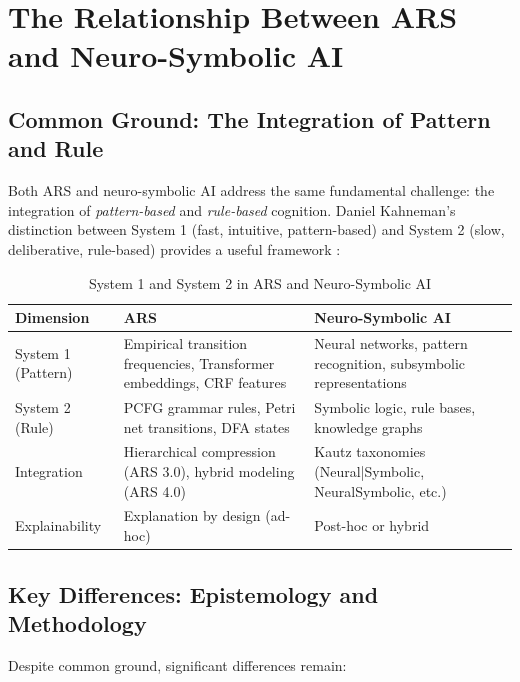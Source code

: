 \documentclass[12pt,a4paper]{article}
\begin{document}
\section{The Relationship Between ARS and Neuro-Symbolic AI}

\subsection{Common Ground: The Integration of Pattern and Rule}

Both ARS and neuro-symbolic AI address the same fundamental challenge: the 
integration of \textit{pattern-based} and \textit{rule-based} cognition. 
Daniel Kahneman's distinction between System 1 (fast, intuitive, pattern-based) 
and System 2 (slow, deliberative, rule-based) provides a useful framework 
\citep{kahneman2011thinking}:

\begin{table}[H]
\centering
\caption{System 1 and System 2 in ARS and Neuro-Symbolic AI}
\label{tab:kahneman}
\begin{tabular}{@{} p{3cm} p{4cm} p{4cm} @{}}
\toprule
\textbf{Dimension} & \textbf{ARS} & \textbf{Neuro-Symbolic AI} \\
\midrule
System 1 (Pattern) & Empirical transition frequencies, Transformer embeddings, CRF features & Neural networks, pattern recognition, subsymbolic representations \\
System 2 (Rule) & PCFG grammar rules, Petri net transitions, DFA states & Symbolic logic, rule bases, knowledge graphs \\
Integration & Hierarchical compression (ARS 3.0), hybrid modeling (ARS 4.0) & Kautz taxonomies (Neural|Symbolic, NeuralSymbolic, etc.) \\
Explainability & Explanation by design (ad-hoc) & Post-hoc or hybrid \\
\bottomrule
\end{tabular}
\end{table}

\subsection{Key Differences: Epistemology and Methodology}

Despite common ground, significant differences remain:
\end{document}
